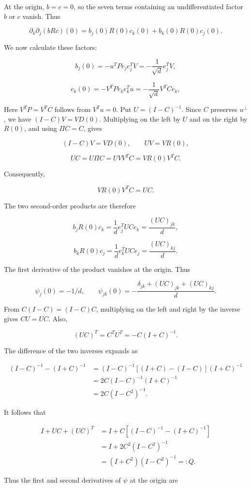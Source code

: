\documentclass[11pt,a4paper]{article}
\begin{document}
At the origin, \(b=c=0\), so the seven terms containing an undifferentiated factor \(b\) or \(c\) vanish. Thus

\[
\partial_k\partial_j(bRc)(0)=b_j(0)R(0)c_k(0)+b_k(0)R(0)c_j(0).
\]

We now calculate these factors:

\[
b_j(0)=-u^TPe_je_j^TV
=-\frac1{\sqrt d}e_j^TV,
\]

\[
c_k(0)=-V^TPe_ke_k^Tu
=-\frac1{\sqrt d}V^TCe_k,
\]

Here \(V^TP=V^TC\) follows from \(V^Tu=0\). Put \(U=(I-C)^{-1}\). Since \(C\) preserves \(u^\perp\), we have \((I-C)V=VD(0)\). Multiplying on the left by \(U\) and on the right by \(R(0)\), and using \(\Pi C=C\), gives

\[
(I-C)V=VD(0),\qquad UV=VR(0),
\]

\[
UC=U\Pi C=UVV^TC=VR(0)V^TC.
\]

Consequently,

\[
VR(0)V^TC=UC.
\]

The two second-order products are therefore

\[
b_jR(0)c_k=\frac1d e_j^TUC e_k=\frac{(UC)_{jk}}d,
\]

\[
b_kR(0)c_j=\frac1d e_k^TUC e_j=\frac{(UC)_{kj}}d.
\]

The first derivative of the product vanishes at the origin. Thus

\[
\psi_j(0)=-1/d,\qquad
\psi_{jk}(0)=-\frac{\delta_{jk}+(UC)_{jk}+(UC)_{kj}}d.
\]

From \(C(I-C)=(I-C)C\), multiplying on the left and right by the inverse gives \(CU=UC\). Also,

\[
(UC)^T=C^TU^T=-C(I+C)^{-1}.
\]

The difference of the two inverses expands as

\[
\begin{aligned}
(I-C)^{-1}-(I+C)^{-1}
&=(I-C)^{-1}[(I+C)-(I-C)](I+C)^{-1}\\
&=2C(I-C)^{-1}(I+C)^{-1}\\
&=2C(I-C^2)^{-1}.
\end{aligned}
\]

It follows that

\[
\begin{aligned}
I+UC+(UC)^T
&=I+C[(I-C)^{-1}-(I+C)^{-1}]\\
&=I+2C^2(I-C^2)^{-1}\\
&=(I+C^2)(I-C^2)^{-1}=:Q.
\end{aligned}
\]

Thus the first and second derivatives of \(\psi\) at the origin are
\end{document}
